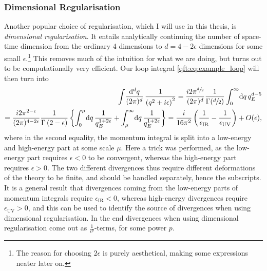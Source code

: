 \documentclass[../main.tex]{subfiles}
\begin{document}
\subsubsection*{Dimensional Regularisation}
Another popular choice of regularisation, which I will use in this thesis, is
\emph{dimensional regularisation}. It entails analytically continuing the
number of space-time dimension from the ordinary 4 dimensions to \(d
= 4-2\epsilon\) dimensions for some small \(\epsilon\).\footnote{The reason for choosing \(2\epsilon\) is purely aesthetical, making some expressions neater later on.} This removes much of
the intuition for what we are doing, but turns out to be computationally very
efficient. Our loop integral \cref{qft:eq:example_loop} will then turn into
\begin{align}
  \label{qft:eq:dimreg_loop_example}
  \nonumber
  \loopintegral[d]{q} \frac{1}{\pclosed{q^2+i\epsilon}^2} = \frac{i
    2\pi^{\sfrac{d}{2}}}{(2\pi)^d} \frac{1}{\Gamma(\sfrac{d}{2})}
  \integral[_0^\infty]{q} q_E^{d-5} \\
  = \frac{i 2\pi^{2-\epsilon}}{(2\pi)^{4-2\epsilon}}
  \frac{1}{\Gamma\pclosed{2-\epsilon}} \cclosed{ \integral[_0^\mu]{q}
  \frac{1}{q_E^{1+2\epsilon}} + \integral[_\mu^\infty]{q}
  \frac{1}{q_E^{1+2\epsilon}} } = \frac{i}{16\pi^2}
  \pclosed{\frac{1}{\epsilon_\text{IR}} - \frac{1}{\epsilon_\text{UV}}} +
  O(\epsilon),
\end{align}
where in the second equality, the momentum integral is split into a low-energy and high-energy part at some scale \(\mu\).
Here a trick was performed, as the low-energy part requires \(\epsilon < 0\) to be convergent, whereas the high-energy part requires \(\epsilon>0\).
The two different divergences thus require different deformations of the theory to be finite, and should be handled separately, hence the subscripts.
It is a general result that divergences coming from the low-energy parts of momentum integrals require \(\epsilon_{\text{IR}} < 0\), whereas high-energy divergences require \(\epsilon_{\text{UV}} > 0\), and this can be used to identify the source of divergences when using dimensional regularisation.
In the end divergences when using dimensional regularisation come out as \(\frac{1}{\epsilon^p}\)-terms, for some power \(p\).
\medskip
\end{document}
